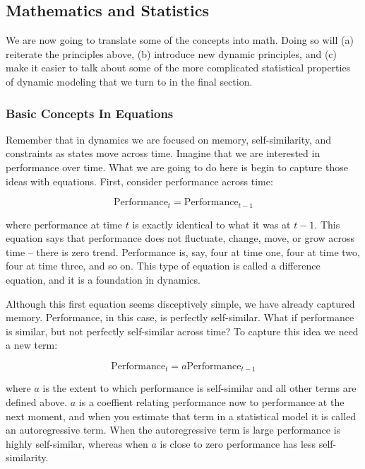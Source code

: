 \documentclass[english,,man]{apa6}
\theoremstyle{definition}
\theoremstyle{definition}
\theoremstyle{definition}
\theoremstyle{remark}
\begin{document}
\hypertarget{mathematics-and-statistics}{%
\subsection{Mathematics and
Statistics}\label{mathematics-and-statistics}}

We are now going to translate some of the concepts into math. Doing so
will (a) reiterate the principles above, (b) introduce new dynamic
principles, and (c) make it easier to talk about some of the more
complicated statistical properties of dynamic modeling that we turn to
in the final section.

\hypertarget{basic-concepts-in-equations}{%
\subsubsection{Basic Concepts In
Equations}\label{basic-concepts-in-equations}}

Remember that in dynamics we are focused on memory, self-similarity, and
constraints as states move across time. Imagine that we are interested
in performance over time. What we are going to do here is begin to
capture those ideas with equations. First, consider performance across
time:

\begin{equation}
\textrm{Performance}_{t} = \textrm{Performance}_{t-1}
\end{equation}

\noindent where performance at time \(t\) is exactly identical to what
it was at \(t-1\). This equation says that performance does not
fluctuate, change, move, or grow across time -- there is zero trend.
Performance is, say, four at time one, four at time two, four at time
three, and so on. This type of equation is called a difference equation,
and it is a foundation in dynamics.

Although this first equation seems disceptively simple, we have already
captured memory. Performance, in this case, is perfectly self-similar.
What if performance is similar, but not perfectly self-similar across
time? To capture this idea we need a new term:

\begin{equation}
\textrm{Performance}_{t} = a \textrm{Performance}_{t-1}
\end{equation}

\noindent where \(a\) is the extent to which performance is self-similar
and all other terms are defined above. \(a\) is a coeffient relating
performance now to performance at the next moment, and when you estimate
that term in a statistical model it is called an autoregressive term.
When the autoregressive term is large performance is highly
self-similar, whereas when \(a\) is close to zero performance has less
self-similarity.
\end{document}
